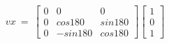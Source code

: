 \documentclass[preview]{standalone}
\begin{document}
\begin{align*}
vx\ =\ \begin{bmatrix}
                        0 & 0 & 0\\
                        0 & cos180 & sin180\\
                        0 & -sin180 & cos180
                        \end{bmatrix}\begin{bmatrix}
                        1\\
                        0\\
                        1
                        \end{bmatrix}\\
\end{align*}
\end{document}
